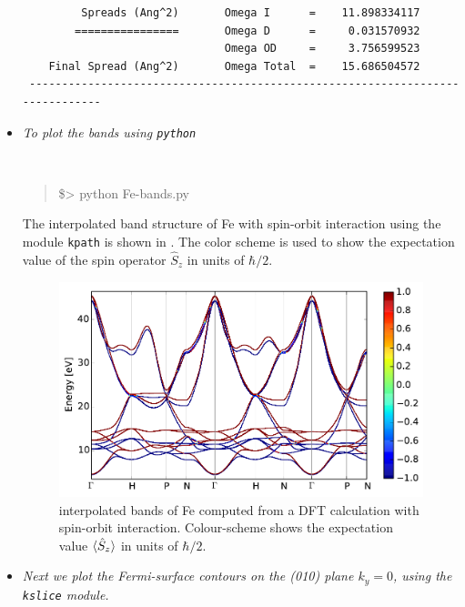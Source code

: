 \begin{itemize}
\begin{tcolorbox}[sharp corners,boxrule=0.5pt]
{\begin{verbatim}
         Spreads (Ang^2)       Omega I      =    11.898334117
        ================       Omega D      =     0.031570932
                               Omega OD     =     3.756599523
    Final Spread (Ang^2)       Omega Total  =    15.686504572
 ------------------------------------------------------------------------------
	\end{verbatim}
	}
	\end{tcolorbox}
	\item[] {\it To plot the bands using {\tt python}}
	{\tt
	\begin{quote}
	\$> python Fe-bands.py 
	\end{quote}
	}
	The interpolated band structure of Fe with spin-orbit interaction using the module {\tt kpath} is shown in . The color scheme is used to show the expectation value of the spin operator $\hat{S}_z$ in units of $\hbar/2$.
	\begin{figure}[h!]
	\centering
	\includegraphics[width=0.6\columnwidth]{figure/example17/Fe_bandstructure.pdf}
	\caption{\Wannier{} interpolated bands of Fe computed from a DFT calculation with spin-orbit interaction. Colour-scheme shows the expectation value $\braket{\hat{S}_z}$ in units of $\hbar/2$.}\label{fig17.1}
	\end{figure}
	\item[]{\it Next we plot the Fermi-surface contours on the (010) plane $k_y = 0$, using the {\tt kslice} module.}


\end{itemize}
